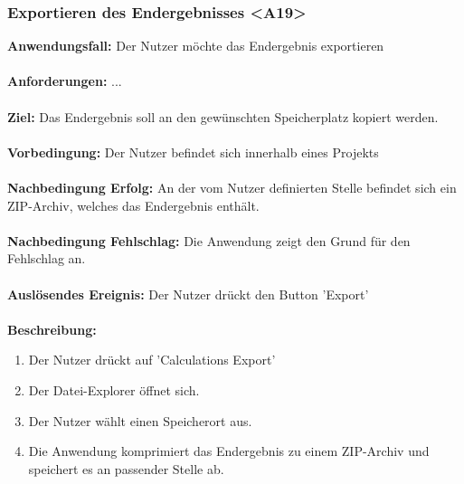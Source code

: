 \documentclass[parskip=full]{scrartcl} %
\begin{document}
\subsubsection*{Exportieren des Endergebnisses <A19>}
\textbf{Anwendungsfall:} Der Nutzer möchte das Endergebnis exportieren\\\\
\textbf{Anforderungen:} ...\\\\
\textbf{Ziel:} Das Endergebnis soll an den gewünschten Speicherplatz kopiert werden. \\\\
\textbf{Vorbedingung:}  Der Nutzer befindet sich innerhalb eines Projekts\\\\
\textbf{Nachbedingung Erfolg:} An der vom Nutzer definierten Stelle befindet sich ein ZIP-Archiv, welches das Endergebnis enthält. \\\\
\textbf{Nachbedingung Fehlschlag:} Die Anwendung zeigt den Grund für den Fehlschlag an.\\\\
\textbf{Auslösendes Ereignis:} Der Nutzer drückt den Button 'Export' \\\\
\textbf{Beschreibung:}
\begin{enumerate}
    \item Der Nutzer drückt auf 'Calculations Export'
    \item Der Datei-Explorer öffnet sich.
    \item Der Nutzer wählt einen Speicherort aus.
    \item Die Anwendung komprimiert das Endergebnis zu einem ZIP-Archiv und speichert es an passender Stelle ab.
\end{enumerate}
\newpage
\end{document}
